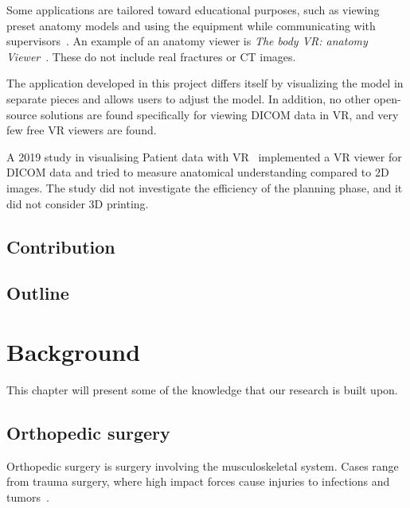 \documentclass[a4paper]{report}
\begin{document}
Some applications are tailored toward educational purposes, such as viewing preset anatomy models and using the equipment while communicating with supervisors~\cite{uppot_implementing_2019}. An example of an anatomy viewer is \emph{The body VR: anatomy Viewer}~\cite{noauthor_body_nodate}. These do not include real fractures or CT images.

The application developed in this project differs itself by visualizing the model in separate pieces and allows users to adjust the model.
In addition, no other open-source solutions are found specifically for viewing DICOM data in VR, and very few free VR viewers are found.

A 2019 study in visualising Patient data with VR~\cite{vertemati_virtual_2019} implemented a VR viewer for DICOM data and tried to measure anatomical understanding compared to 2D images. The study did not investigate the efficiency of the planning phase, and it did not consider 3D printing.

\section{Contribution}
\section{Outline}

\chapter{Background}\label{Background}
This chapter will present some of the knowledge that our research is built upon.

\section{Orthopedic surgery}

Orthopedic surgery is surgery involving the musculoskeletal system. Cases range from trauma surgery, where high impact forces cause injuries to infections and tumors~\cite{swiontkowski_manual_2013}.
\end{document}
